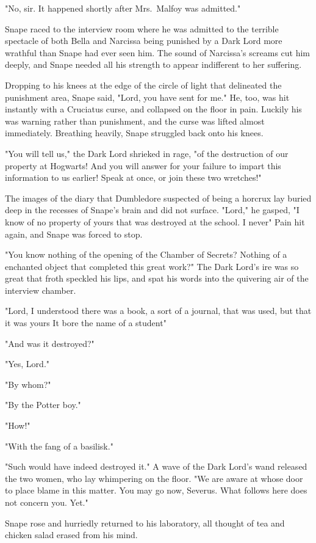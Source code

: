 "No, sir. It happened shortly after Mrs.~Malfoy was admitted."

Snape raced to the interview room where he was admitted to the terrible spectacle of both Bella and Narcissa being punished by a Dark Lord more wrathful than Snape had ever seen him. The sound of Narcissa's screams cut him deeply, and Snape needed all his strength to appear indifferent to her suffering.

Dropping to his knees at the edge of the circle of light that delineated the punishment area, Snape said, "Lord, you have sent for me." He, too, was hit instantly with a Cruciatus curse, and collapsed on the floor in pain. Luckily his was warning rather than punishment, and the curse was lifted almost immediately. Breathing heavily, Snape struggled back onto his knees.

"You will tell us," the Dark Lord shrieked in rage, "of the destruction of our property at Hogwarts! And you will answer for your failure to impart this information to us earlier! Speak at once, or join these two wretches!"

The images of the diary that Dumbledore suspected of being a horcrux lay buried deep in the recesses of Snape's brain and did not surface. "Lord," he gasped, "I know of no property of yours that was destroyed at the school. I never{\el}" Pain hit again, and Snape was forced to stop.

"You know nothing of the opening of the Chamber of Secrets? Nothing of a enchanted object that completed this great work?" The Dark Lord's ire was so great that froth speckled his lips, and spat his words into the quivering air of the interview chamber.

"Lord, I understood there was a book, a sort of a journal, that was used, but that it was yours{\el} It bore the name of a student{\el}"

"And was it destroyed?"

"Yes, Lord."

"By whom?"

"By the Potter boy."

"How!"

"With the fang of a basilisk."

"Such would have indeed destroyed it." A wave of the Dark Lord's wand released the two women, who lay whimpering on the floor. "We are aware at whose door to place blame in this matter. You may go now, Severus. What follows here does not concern you. Yet."

Snape rose and hurriedly returned to his laboratory, all thought of tea and chicken salad erased from his mind.

